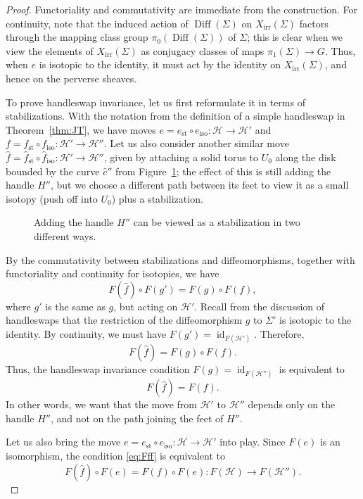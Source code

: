 \documentclass [11pt]{amsart}
\theoremstyle{remark}
\def\st{\operatorname{st}}
\def\iso{\operatorname{iso}}
\def\Char {X}
\def\CharIrr {\Char_{\operatorname{irr}}}
\def\cH{\mathcal{H}}
\def\Diff{\operatorname{Diff}}
\def\id{\operatorname{id}}
\begin{document}
\begin{proof}
Functoriality and commutativity are immediate from the construction. For continuity, note that the induced action of $\Diff(\Sigma)$ on $\CharIrr(\Sigma)$ factors through the mapping class group $\pi_0(\Diff(\Sigma))$ of $\Sigma$; this is clear when we view the elements of $\CharIrr(\Sigma)$ as conjugacy classes of maps $\pi_1(\Sigma) \to G$. Thus, when $e$ is isotopic to the identity, it must act by the identity on $\CharIrr(\Sigma)$, and hence on the perverse sheaves.

To prove handleswap invariance, let us first reformulate it in terms of stabilizations. With the notation from the definition of a simple handleswap in Theorem~\ref{thm:JT}, we have moves $e = e_{\st} \circ e_{\iso}: \cH \to \cH'$ and $f = f_{\st} \circ f_{\iso}: \cH' \to \cH''$. Let us also consider another similar move $\hat{f}= \hat{f}_{\st} \circ \hat{f}_{\iso}: \cH' \to \cH''$, given by attaching a solid torus to $U_0$ along the disk bounded by the curve $\hat{c}''$ from Figure~\ref{fig:handleswap2}; the effect of this is still adding the handle $H''$, but we choose a different path between its feet to view it as a small  isotopy (push off into $U_0$) plus a stabilization. 

\begin {figure}
\begin {center}

\caption {Adding the handle $H''$ can be viewed as a stabilization in two different ways.}
\label{fig:handleswap2}
\end {center}
\end {figure}

By the commutativity between stabilizations and diffeomorphisms, together with functoriality and continuity for isotopies, we have
$$ F(\hat{f}) \circ F(g') = F(g) \circ F(f),$$
where $g'$ is the same as $g$, but acting on $\cH'$. Recall from the discussion of handleswaps that the restriction of the diffeomorphism $g$ to $\Sigma'$ is isotopic to the identity. By continuity, we must have $F(g') = \id_{F(\cH')}$. Therefore,
$$F(\hat{f}) = F(g) \circ F(f).$$
Thus, the handleswap invariance condition $F(g) = \id_{F(\cH'')}$ is equivalent to 
\begin{equation}
\label{eq:Fff}
 F(\hat{f}) = F(f).
 \end{equation}
In other words, we want that the move from $\cH'$ to $\cH''$ depends only on the handle $H''$, and not on the path joining the feet of $H''$. 

Let us also bring the move $e = e_{\st} \circ e_{\iso}: \cH \to \cH'$ into play. Since $F(e)$ is an isomorphism, the condition \eqref{eq:Fff} is equivalent to
\begin{equation}
\label{eq:Fe}
 F(\hat{f}) \circ F(e)= F(f) \circ F(e) : F(\cH) \to F(\cH'').
 \end{equation}
 

\end{proof}
\end{document}
